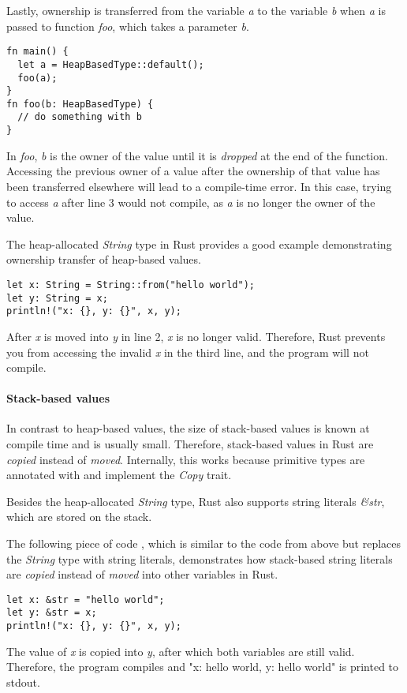 \documentclass[sigplan,11pt,nonacm]{acmart}
\begin{document}
Lastly, ownership is transferred from the variable \emph{a} to the variable \emph{b} when \emph{a} is passed to function \emph{foo}, which takes a parameter \emph{b}.
\begin{lstlisting}
fn main() {
  let a = HeapBasedType::default();
  foo(a);
}
fn foo(b: HeapBasedType) {
  // do something with b
}
\end{lstlisting}
In \emph{foo}, \emph{b} is the owner of the value until it is \emph{dropped} at the end of the function.
Accessing the previous owner of a value after the ownership of that value has been transferred elsewhere will lead to a compile-time error.
In this case, trying to access \emph{a} after line 3 would not compile, as \emph{a} is no longer the owner of the value.

The heap-allocated \emph{String} type in Rust provides a good example demonstrating ownership transfer of heap-based values.
\begin{lstlisting}
let x: String = String::from("hello world");
let y: String = x;
println!("x: {}, y: {}", x, y);
\end{lstlisting}
After \emph{x} is moved into \emph{y} in line 2, \emph{x} is no longer valid.
Therefore, Rust prevents you from accessing the invalid \emph{x} in the third line, and the program will not compile.


\paragraph{Stack-based values}

In contrast to heap-based values, the size of stack-based values is known at compile time and is usually small.
Therefore, stack-based values in Rust are \emph{copied} instead of \emph{moved}.
Internally, this works because primitive types are annotated with and implement the \emph{Copy} trait.

Besides the heap-allocated \emph{String} type, Rust also supports string literals \emph{\&str}, which are stored on the stack.

The following piece of code \cite{rust-book}, which is similar to the code from above but replaces the \emph{String} type with string literals, demonstrates how stack-based string literals are \emph{copied} instead of \emph{moved} into other variables in Rust.
\begin{lstlisting}
let x: &str = "hello world";
let y: &str = x;
println!("x: {}, y: {}", x, y);
\end{lstlisting}
The value of \emph{x} is copied into \emph{y}, after which both variables are still valid.
Therefore, the program compiles and "x: hello world, y: hello world" is printed to stdout.
\end{document}
